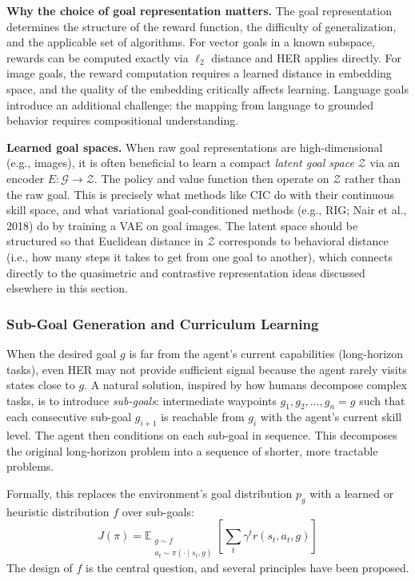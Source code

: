\documentclass[11pt, letterpaper]{article}
\begin{document}
\begin{remark}
    \textbf{Why the choice of goal representation matters.} The goal representation determines the structure of the reward function, the difficulty of generalization, and the applicable set of algorithms. For vector goals in a known subspace, rewards can be computed exactly via \(\ell_2\) distance and HER applies directly. For image goals, the reward computation requires a learned distance in embedding space, and the quality of the embedding critically affects learning. Language goals introduce an additional challenge: the mapping from language to grounded behavior requires compositional understanding.
 
    \textbf{Learned goal spaces.} When raw goal representations are high-dimensional (e.g., images), it is often beneficial to learn a compact \textit{latent goal space} \(\mathcal{Z}\) via an encoder \(E : \mathcal{G} \to \mathcal{Z}\). The policy and value function then operate on \(\mathcal{Z}\) rather than the raw goal. This is precisely what methods like CIC do with their continuous skill space, and what variational goal-conditioned methods (e.g., RIG; Nair et al., 2018) do by training a VAE on goal images. The latent space should be structured so that Euclidean distance in \(\mathcal{Z}\) corresponds to behavioral distance (i.e., how many steps it takes to get from one goal to another), which connects directly to the quasimetric and contrastive representation ideas discussed elsewhere in this section.
\end{remark}
 
\subsubsection{Sub-Goal Generation and Curriculum Learning}
 
\begin{concept}
    When the desired goal \(g\) is far from the agent's current capabilities (long-horizon tasks), even HER may not provide sufficient signal because the agent rarely visits states close to \(g\). A natural solution, inspired by how humans decompose complex tasks, is to introduce \textit{sub-goals}: intermediate waypoints \(g_1, g_2, \dots, g_n = g\) such that each consecutive sub-goal \(g_{i+1}\) is reachable from \(g_i\) with the agent's current skill level. The agent then conditions on each sub-goal in sequence. This decomposes the original long-horizon problem into a sequence of shorter, more tractable problems.
 
    Formally, this replaces the environment's goal distribution \(p_g\) with a learned or heuristic distribution \(f\) over sub-goals:
    \[
        J(\pi) = \mathbb{E}_{\substack{g \sim f \\ a_t \sim \pi(\cdot \mid s_t, g)}} \left[ \sum_t \gamma^t r(s_t, a_t, g) \right]
    \]
    The design of \(f\) is the central question, and several principles have been proposed.
\end{concept}
 
\end{document}
